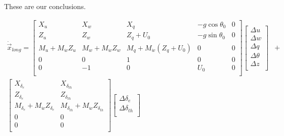 These are our conclusions.

\begin{align*}
    \dot{\vec{x}}_{long} =
    \left[ \begin{array}{ *{5}{c} }
      X_u & X_w & X_q & -g \cos \theta_0 & 0 \\
      Z_u & Z_w & Z_q + U_0 & -g \sin \theta_0 & 0 \\
      M_u + M_{\dot{w}} Z_{u} & M_w + M_{\dot{w}} Z_{w} & M_q + M_{\dot{w}} \left( Z_{q} + U_0 \right) & 0 & 0 \\
      0 & 0 & 1 & 0 & 0 \\
      0 & -1 & 0 & U_0 & 0 \\
    \end{array} \right]
    \left[ \begin{array}{ *{1}{c} }
      \Delta u \\
      \Delta w \\
      \Delta q \\
      \Delta \theta \\
      \Delta z \\
    \end{array} \right] & + \\
    \left[ \begin{array}{ *{5}{c} }
      X_{\delta_e} & X_{\delta_{th}} \\
      Z_{\delta_e} & Z_{\delta_{th}} \\
      M_{\delta_e} + M_{\dot{w}} Z_{\delta_e} & M_{\delta_{th}} + M_{\dot{w}} Z_{\delta_{th}} \\
      0 & 0 \\
      0 & 0 \\
    \end{array} \right]
    \left[ \begin{array}{ *{1}{c} }
      \Delta \delta_e \\
      \Delta \delta_{th} \\
    \end{array} \right] & \\
\end{align*}

